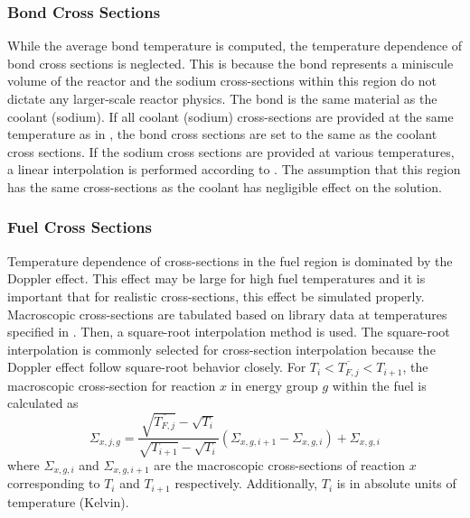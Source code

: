     \subsubsection{Bond Cross Sections}
      While the average bond temperature is computed, the temperature dependence
      of bond cross sections is neglected. This is because the bond represents a
      miniscule volume of the reactor and the sodium cross-sections within this
      region do not dictate any larger-scale reactor physics. The bond is the 
      same material as the coolant (sodium). If all coolant (sodium) 
      cross-sections are provided at the same temperature as in 
      , the bond cross sections are set to the same as the 
      coolant cross sections. If the sodium cross sections are provided at
      various temperatures, a linear interpolation is performed according to
      . The assumption that this region has the
      same cross-sections as the coolant has negligible effect on the solution.

    \subsubsection{Fuel Cross Sections}
      Temperature dependence of cross-sections in the fuel region is dominated
      by the Doppler effect. This effect may be large for high fuel temperatures
      and it is important that for realistic cross-sections, this effect be
      simulated properly. Macroscopic cross-sections are tabulated based on
      library data at temperatures specified in . Then, a
      square-root interpolation method is used. The square-root interpolation is
      commonly selected for cross-section interpolation because the Doppler
      effect follow square-root behavior closely. For 
      $T_i < \overline{T_{F,j}} < T_{i+1}$, the
      macroscopic cross-section for reaction $x$ in energy group $g$ within the
      fuel is calculated as
      \begin{equation}
        \Sigma_{x,j,g} = 
          \frac{\sqrt{\overline{T_{F,j}}} - \sqrt{T_{i}}}
          {\sqrt{T_{i+1}}-\sqrt{T_{i}}}
          (\Sigma_{x,g,i+1} - \Sigma_{x,g,i})  + \Sigma_{x,g,i}
      \end{equation}
      where $\Sigma_{x,g,i}$ and $\Sigma_{x,g,i+1}$ are the macroscopic
      cross-sections of reaction $x$ corresponding to $T_i$ and $T_{i+1}$
      respectively. Additionally, $T_i$ is in absolute units of temperature
      (Kelvin).
      
